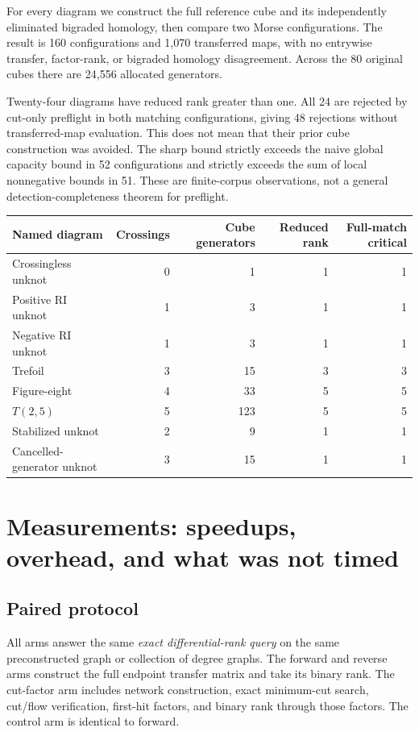 \documentclass[11pt,letterpaper]{article}
\theoremstyle{definition}\newtheorem{definition}[theorem]{Definition}
\theoremstyle{remark}\newtheorem{remark}[theorem]{Remark}
\begin{document}
For every diagram we construct the full reference cube and its independently
eliminated bigraded homology, then compare two Morse configurations.
The result is 160 configurations and 1,070 transferred maps, with no
entrywise transfer, factor-rank, or bigraded homology disagreement.
Across the 80 original cubes there are 24,556 allocated generators.

Twenty-four diagrams have reduced rank greater than one. All 24 are rejected
by cut-only preflight in both matching configurations, giving 48 rejections
without transferred-map evaluation. This does not mean that their prior
cube construction was avoided. The sharp bound strictly exceeds the naive
global capacity bound in 52 configurations and strictly exceeds the sum of
local nonnegative bounds in 51. These are finite-corpus observations, not a
general detection-completeness theorem for preflight.

\begin{center}
\small
\begin{tabular}{lrrrr}
\toprule
Named diagram & Crossings & Cube generators & Reduced rank & Full-match critical\\
\midrule
Crossingless unknot & 0 & 1 & 1 & 1\\
Positive RI unknot & 1 & 3 & 1 & 1\\
Negative RI unknot & 1 & 3 & 1 & 1\\
Trefoil & 3 & 15 & 3 & 3\\
Figure-eight & 4 & 33 & 5 & 5\\
$T(2,5)$ & 5 & 123 & 5 & 5\\
Stabilized unknot & 2 & 9 & 1 & 1\\
Cancelled-generator unknot & 3 & 15 & 1 & 1\\
\bottomrule
\end{tabular}
\end{center}

\section{Measurements: speedups, overhead, and what was not timed}
\subsection{Paired protocol}
All arms answer the same \emph{exact differential-rank query} on the same
preconstructed graph or collection of degree graphs. The forward and reverse
arms construct the full endpoint transfer matrix and take its binary rank.
The cut-factor arm includes network construction, exact minimum-cut search,
cut/flow verification, first-hit factors, and binary rank through those
factors. The control arm is identical to forward.
\end{document}
